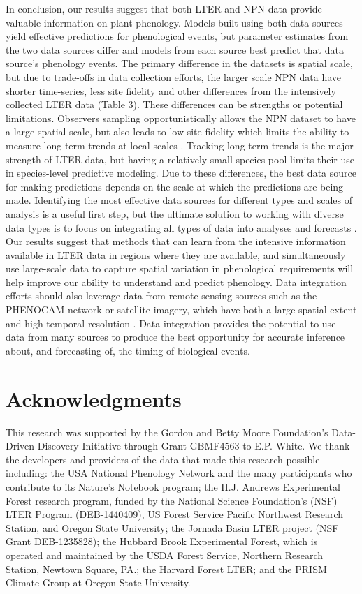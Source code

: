\documentclass[fleqn,12pt,lineno]{article}
\begin{document}
In conclusion, our results suggest that both LTER and NPN data provide valuable information on plant phenology. Models built using both data sources yield effective predictions for phenological events, but parameter estimates from the two data sources differ and models from each source best predict that data source's phenology events. The primary difference in the datasets is spatial scale, but due to trade-offs in data collection efforts, the larger scale NPN data have shorter time-series, less site fidelity and other differences from the intensively collected LTER data (Table 3). These differences can be strengths or potential limitations. Observers sampling opportunistically allows the NPN dataset to have a large spatial scale, but also leads to low site fidelity which limits the ability to measure long-term trends at local scales \citep{gerst2016}. Tracking long-term trends is the major strength of LTER data, but having a relatively small species pool limits their use in species-level predictive modeling. Due to these differences, the best data source for making predictions depends on the scale at which the predictions are being made. Identifying the most effective data sources for different types and scales of analysis is a useful first step, but the ultimate solution to working with diverse data types is to focus on integrating all types of data into analyses and forecasts \citep{hanks2018, melaas2016}. Our results suggest that methods that can learn from the intensive information available in LTER data in regions where they are available, and simultaneously use large-scale data to capture spatial variation in phenological requirements will help improve our ability to understand and predict phenology. Data integration efforts should also leverage data from remote sensing sources such as the PHENOCAM network or satellite imagery, which have both a large spatial extent and high temporal resolution \citep{richardson2018}. Data integration provides the potential to use data from many sources to produce the best opportunity for accurate inference about, and forecasting of, the timing of biological events.


\section*{Acknowledgments}

This research was supported by the Gordon and Betty Moore Foundation’s Data-Driven Discovery Initiative through Grant GBMF4563 to E.P. White. We thank the developers and providers of the data that made this research possible including: the USA National Phenology Network and the many participants who contribute to its Nature’s Notebook program; the H.J. Andrews Experimental Forest research program, funded by the National Science Foundation's (NSF) LTER Program (DEB-1440409), US Forest Service Pacific Northwest Research Station, and Oregon State University; the Jornada Basin LTER project (NSF Grant DEB-1235828); the Hubbard Brook Experimental Forest, which is operated and maintained by the USDA Forest Service, Northern Research Station, Newtown Square, PA.; the Harvard Forest LTER; and the PRISM Climate Group at Oregon State University.
\end{document}
